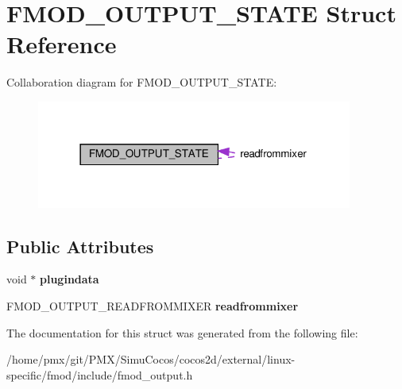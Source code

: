 \hypertarget{structFMOD__OUTPUT__STATE}{}\section{F\+M\+O\+D\+\_\+\+O\+U\+T\+P\+U\+T\+\_\+\+S\+T\+A\+TE Struct Reference}
\label{structFMOD__OUTPUT__STATE}


Collaboration diagram for F\+M\+O\+D\+\_\+\+O\+U\+T\+P\+U\+T\+\_\+\+S\+T\+A\+TE\+:
\nopagebreak
\begin{figure}[H]
\begin{center}
\leavevmode
\includegraphics[width=294pt]{structFMOD__OUTPUT__STATE__coll__graph}
\end{center}
\end{figure}
\subsection*{Public Attributes}
\begin{DoxyCompactItemize}
\item 
\mbox{\label{structFMOD__OUTPUT__STATE_a14384e8f23665883e32c6888fe7575e8}} 
void $\ast$ {\bfseries plugindata}
\item 
\mbox{\label{structFMOD__OUTPUT__STATE_a297cdb7fbba2150340cceecf8d4c9ca1}} 
F\+M\+O\+D\+\_\+\+O\+U\+T\+P\+U\+T\+\_\+\+R\+E\+A\+D\+F\+R\+O\+M\+M\+I\+X\+ER {\bfseries readfrommixer}
\end{DoxyCompactItemize}


The documentation for this struct was generated from the following file\+:\begin{DoxyCompactItemize}
\item 
/home/pmx/git/\+P\+M\+X/\+Simu\+Cocos/cocos2d/external/linux-\/specific/fmod/include/fmod\+\_\+output.\+h\end{DoxyCompactItemize}
